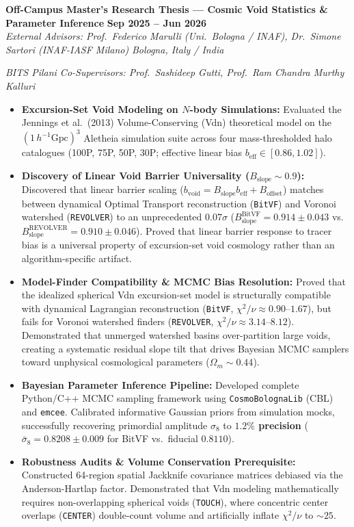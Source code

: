 \documentclass[10pt,a4paper]{article}
\newcommand{\entryheader}[4]{%
    \noindent\textbf{#1} \hfill {\color{secondaryslate}\footnotesize\textbf{#2}}\\%
    \noindent\textit{#3} \hfill {\color{secondaryslate}\footnotesize\textit{#4}}\vspace{1.5pt}%
}
\begin{document}
\entryheader{Off-Campus Master's Research Thesis --- Cosmic Void Statistics \& Parameter Inference}{Sep 2025 -- Jun 2026}{External Advisors: Prof.\ Federico Marulli (Uni.\ Bologna / INAF), Dr.\ Simone Sartori (INAF-IASF Milano)}{Bologna, Italy / India}
\textit{BITS Pilani Co-Supervisors: Prof.\ Sashideep Gutti, Prof.\ Ram Chandra Murthy Kalluri}
\begin{itemize}
    \item \textbf{Excursion-Set Void Modeling on $N$-body Simulations:} Evaluated the Jennings et al.\ (2013) Volume-Conserving (Vdn) theoretical model on the $(1\,h^{-1}\mathrm{Gpc})^3$ Aletheia simulation suite across four mass-thresholded halo catalogues (100P, 75P, 50P, 30P; effective linear bias $b_{\mathrm{eff}} \in [0.86, 1.02]$).
    \item \textbf{Discovery of Linear Void Barrier Universality ($B_{\mathrm{slope}} \sim 0.9$):} Discovered that linear barrier scaling ($b_{\mathrm{void}} = B_{\mathrm{slope}} b_{\mathrm{eff}} + B_{\mathrm{offset}}$) matches between dynamical Optimal Transport reconstruction (\texttt{BitVF}) and Voronoi watershed (\texttt{REVOLVER}) to an unprecedented \textbf{$0.07\sigma$} ($B_{\mathrm{slope}}^{\mathrm{BitVF}} = 0.914 \pm 0.043$ vs.\ $B_{\mathrm{slope}}^{\mathrm{REVOLVER}} = 0.910 \pm 0.046$). Proved that linear barrier response to tracer bias is a universal property of excursion-set void cosmology rather than an algorithm-specific artifact.
    \item \textbf{Model-Finder Compatibility \& MCMC Bias Resolution:} Proved that the idealized spherical Vdn excursion-set model is structurally compatible with dynamical Lagrangian reconstruction (\texttt{BitVF}, $\chi^2/\nu \approx 0.90\text{--}1.67$), but fails for Voronoi watershed finders (\texttt{REVOLVER}, $\chi^2/\nu \approx 3.14\text{--}8.12$). Demonstrated that unmerged watershed basins over-partition large voids, creating a systematic residual slope tilt that drives Bayesian MCMC samplers toward unphysical cosmological parameters ($\Omega_m \sim 0.44$).
    \item \textbf{Bayesian Parameter Inference Pipeline:} Developed complete Python/C++ MCMC sampling framework using \texttt{CosmoBolognaLib} (CBL) and \texttt{emcee}. Calibrated informative Gaussian priors from simulation mocks, successfully recovering primordial amplitude $\sigma_8$ to \textbf{$1.2\%$ precision} ($\bar{\sigma}_8 = 0.8208 \pm 0.009$ for BitVF vs.\ fiducial $0.8110$).
    \item \textbf{Robustness Audits \& Volume Conservation Prerequisite:} Constructed 64-region spatial Jackknife covariance matrices debiased via the Anderson-Hartlap factor. Demonstrated that Vdn modeling mathematically requires non-overlapping spherical voids (\texttt{TOUCH}), where concentric center overlaps (\texttt{CENTER}) double-count volume and artificially inflate $\chi^2/\nu$ to $\sim 25$.
\end{itemize}
\end{document}
